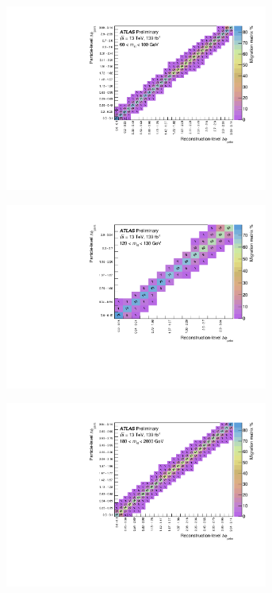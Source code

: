 \begin{figure}[htb]
  \centering
  \begin{subfigure}{.49\textwidth}\centering\includegraphics[width = 0.95\textwidth]{Figures/m4l/UnfoldingStudies/v014_matrices/deltaPhiPairs_m4l60-100Matrix.pdf}\end{subfigure}
  \begin{subfigure}{.49\textwidth}\centering\includegraphics[width = 0.95\textwidth]{Figures/m4l/UnfoldingStudies/v014_matrices/deltaPhiPairs_m4l120-130Matrix.pdf}\end{subfigure}
  \begin{subfigure}{.49\textwidth}\centering\includegraphics[width = 0.95\textwidth]{Figures/m4l/UnfoldingStudies/v014_matrices/deltaPhiPairs_m4l180-2000Matrix.pdf}\end{subfigure}

\end{figure}
